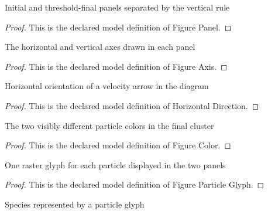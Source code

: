 \begin{definition}
  \label{def:physics:phyx-mini-0555:phyxminiproblems-problemphyxmini0555-figurepanel}
  Initial and threshold-final panels separated by the vertical rule
\end{definition}
\begin{proof}
  This is the declared model definition of Figure Panel.
\end{proof}
\begin{definition}
  \label{def:physics:phyx-mini-0555:phyxminiproblems-problemphyxmini0555-figureaxis}
  The horizontal and vertical axes drawn in each panel
\end{definition}
\begin{proof}
  This is the declared model definition of Figure Axis.
\end{proof}
\begin{definition}
  \label{def:physics:phyx-mini-0555:phyxminiproblems-problemphyxmini0555-horizontaldirection}
  Horizontal orientation of a velocity arrow in the diagram
\end{definition}
\begin{proof}
  This is the declared model definition of Horizontal Direction.
\end{proof}
\begin{definition}
  \label{def:physics:phyx-mini-0555:phyxminiproblems-problemphyxmini0555-figurecolor}
  The two visibly different particle colors in the final cluster
\end{definition}
\begin{proof}
  This is the declared model definition of Figure Color.
\end{proof}
\begin{definition}
  \label{def:physics:phyx-mini-0555:phyxminiproblems-problemphyxmini0555-figureparticleglyph}
  One raster glyph for each particle displayed in the two panels
\end{definition}
\begin{proof}
  This is the declared model definition of Figure Particle Glyph.
\end{proof}
\begin{definition}[species]
  \label{def:physics:phyx-mini-0555:phyxminiproblems-problemphyxmini0555-figureparticleglyph-species}
  Species represented by a particle glyph
\end{definition}
